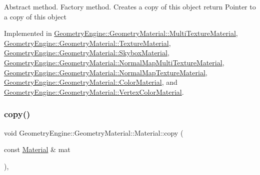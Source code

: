 Abstract method. Factory method. Creates a copy of this object return Pointer to a copy of this object 

Implemented in \mbox{\hyperlink{class_geometry_engine_1_1_geometry_material_1_1_multi_texture_material_a66cef99b68270e1399830bc1b8bc8502}{Geometry\+Engine\+::\+Geometry\+Material\+::\+Multi\+Texture\+Material}}, \mbox{\hyperlink{class_geometry_engine_1_1_geometry_material_1_1_texture_material_ace905cf02deb41ad8aa422ef2fb9070f}{Geometry\+Engine\+::\+Geometry\+Material\+::\+Texture\+Material}}, \mbox{\hyperlink{class_geometry_engine_1_1_geometry_material_1_1_skybox_material_ad1ec431a67d52440abfa24d66dbc12ca}{Geometry\+Engine\+::\+Geometry\+Material\+::\+Skybox\+Material}}, \mbox{\hyperlink{class_geometry_engine_1_1_geometry_material_1_1_normal_map_multi_texture_material_a38df455f7369f68ea2fc6abf31488c40}{Geometry\+Engine\+::\+Geometry\+Material\+::\+Normal\+Map\+Multi\+Texture\+Material}}, \mbox{\hyperlink{class_geometry_engine_1_1_geometry_material_1_1_normal_map_texture_material_a3a3d1f16cf175f084bc3eeab56f6e42f}{Geometry\+Engine\+::\+Geometry\+Material\+::\+Normal\+Map\+Texture\+Material}}, \mbox{\hyperlink{class_geometry_engine_1_1_geometry_material_1_1_color_material_a29dbf04e76b75fcc86f184d072bba0a5}{Geometry\+Engine\+::\+Geometry\+Material\+::\+Color\+Material}}, and \mbox{\hyperlink{class_geometry_engine_1_1_geometry_material_1_1_vertex_color_material_aecf808e45985f2a39662937fc18a21d0}{Geometry\+Engine\+::\+Geometry\+Material\+::\+Vertex\+Color\+Material}}.

\mbox{\label{class_geometry_engine_1_1_geometry_material_1_1_material_a632cdbe72ea955bc591a3902f63b6061}} 
\subsubsection{\texorpdfstring{copy()}{copy()}}
{\footnotesize\ttfamily void Geometry\+Engine\+::\+Geometry\+Material\+::\+Material\+::copy (\begin{DoxyParamCaption}\item[{const \mbox{\hyperlink{class_geometry_engine_1_1_geometry_material_1_1_material}{Material}} \&}]{mat }\end{DoxyParamCaption})\hspace{0.3cm}{\ttfamily [protected]}, {\ttfamily [virtual]}}

